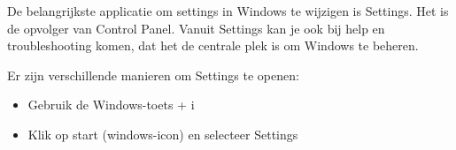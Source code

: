 De belangrijkste applicatie om settings in Windows te wijzigen is Settings. Het is de opvolger van Control Panel. Vanuit Settings kan je ook bij help en troubleshooting komen, dat het de centrale plek is om Windows te beheren.

Er zijn verschillende manieren om Settings te openen:
\begin{itemize}
\item Gebruik de Windows-toets + i
\item Klik op start (windows-icon) en selecteer Settings
\end{itemize}

\begin{minipage}[t]{\linewidth}
\raggedright
{}
\end{minipage}

